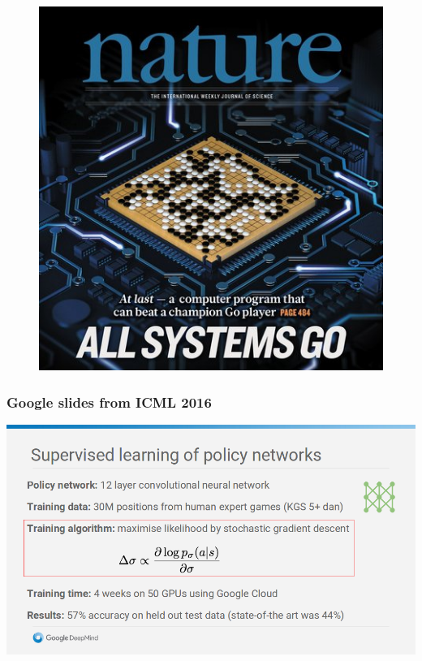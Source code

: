 \documentclass{beamer}
\begin{document}
\begin{frame}
	\begin{figure}[b]
	\centering
	\includegraphics[scale=0.4]{go}
	\end{figure}
\end{frame}

\begin{frame}
	\frametitle{Google slides from ICML 2016}
	\centering
	\includegraphics[scale=0.3]{screenshot}
\end{frame}
\end{document}
